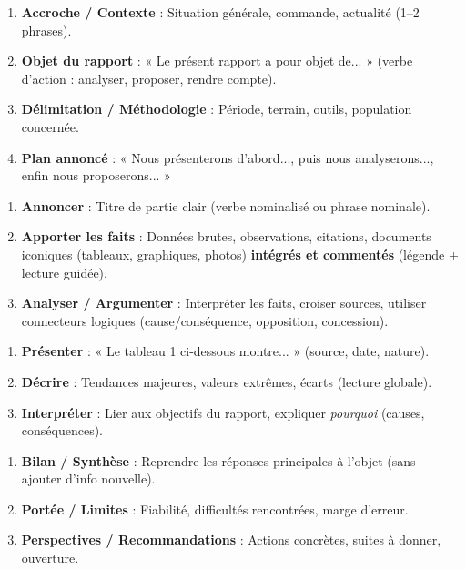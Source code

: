 \documentclass[11pt]{article}
\newcommand{\cle}[1]{{\popxbold\color{popdark}#1}}
\newcounter{popsec}
\newcounter{popsub}
\newcommand{\courssub}[1]{%
  \stepcounter{popsub}%
  \par\vspace{9pt}\noindent{\popxbold\fontsize{11.5}{13}\selectfont\color{popink}{\color{poporange}\thepopsec.\thepopsub}\hspace{6pt}#1}\par\nopagebreak\vspace{4pt}
}
\begin{document}
\begin{bilan}
\courssub{Méthodes express}

\begin{methode}
\begin{enumerate}
\item \textbf{Accroche / Contexte} : Situation générale, commande, actualité (1--2 phrases).
\item \textbf{Objet du rapport} : « Le présent rapport a pour objet de... » (verbe d'action : analyser, proposer, rendre compte).
\item \textbf{Délimitation / Méthodologie} : Période, terrain, outils, population concernée.
\item \textbf{Plan annoncé} : « Nous présenterons d'abord..., puis nous analyserons..., enfin nous proposerons... »
\end{enumerate}
\end{methode}

\begin{methode}
\begin{enumerate}
\item \textbf{Annoncer} : Titre de partie clair (verbe nominalisé ou phrase nominale).
\item \textbf{Apporter les faits} : Données brutes, observations, citations, \cle{documents iconiques} (tableaux, graphiques, photos) \textbf{intégrés et commentés} (légende + lecture guidée).
\item \textbf{Analyser / Argumenter} : Interpréter les faits, croiser sources, utiliser connecteurs logiques (cause/conséquence, opposition, concession).
\end{enumerate}
\end{methode}

\begin{methode}
\begin{enumerate}
\item \textbf{Présenter} : « Le tableau 1 ci-dessous montre... » (source, date, nature).
\item \textbf{Décrire} : Tendances majeures, valeurs extrêmes, écarts (lecture globale).
\item \textbf{Interpréter} : Lier aux objectifs du rapport, expliquer \emph{pourquoi} (causes, conséquences).
\end{enumerate}
\end{methode}

\begin{methode}
\begin{enumerate}
\item \textbf{Bilan / Synthèse} : Reprendre les réponses principales à l'objet (sans ajouter d'info nouvelle).
\item \textbf{Portée / Limites} : Fiabilité, difficultés rencontrées, marge d'erreur.
\item \textbf{Perspectives / Recommandations} : Actions concrètes, suites à donner, ouverture.
\end{enumerate}
\end{methode}


\end{bilan}
\end{document}
